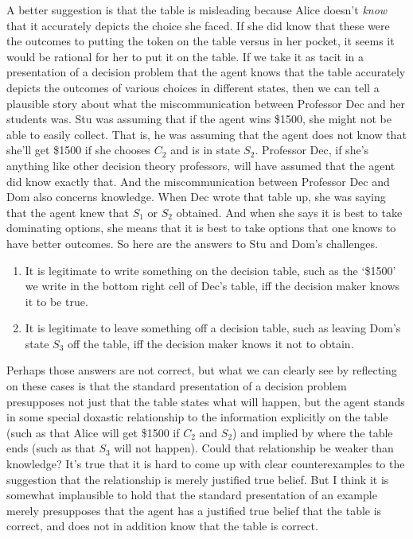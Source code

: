 A better suggestion is that the table is misleading because Alice doesn't \textit{know} that it accurately depicts the choice she faced. If she did know that these were the outcomes to putting the token on the table versus in her pocket, it seems it would be rational for her to put it on the table. If we take it as tacit in a presentation of a decision problem that the agent knows that the table accurately depicts the outcomes of various choices in different states, then we can tell a plausible story about what the miscommunication between Professor Dec and her students was. Stu was assuming that if the agent wins \$1500, she might not be able to easily collect. That is, he was assuming that the agent does not know that she'll get \$1500 if she chooses $C_2$ and is in state $S_2$. Professor Dec, if she's anything like other decision theory professors, will have assumed that the agent did know exactly that. And the miscommunication between Professor Dec and Dom also concerns knowledge. When Dec wrote that table up, she was saying that the agent knew that $S_1$ or $S_2$ obtained. And when she says it is best to take dominating options, she means that it is best to take options that one knows to have better outcomes. So here are the answers to Stu and Dom's challenges.

\begin{enumerate}
\item It is legitimate to write something on the decision table, such as the `\$1500' we write in the bottom right cell of Dec's table, iff the decision maker knows it to be true.
\item It is legitimate to leave something off a decision table, such as leaving Dom's state $S_3$ off the table, iff the decision maker knows it not to obtain.
\end{enumerate}

\noindent Perhaps those answers are not correct, but what we can clearly see by reflecting on these cases is that the standard presentation of a decision problem presupposes not just that the table states what will happen, but the agent stands in some special doxastic relationship to the information explicitly on the table (such as that Alice will get \$1500 if $C_2$ and $S_2$) and implied by where the table ends (such as that $S_3$ will not happen). Could that relationship be weaker than knowledge? It's true that it is hard to come up with clear counterexamples to the suggestion that the relationship is merely justified true belief. But I think it is somewhat implausible to hold that the standard presentation of an example merely presupposes that the agent has a justified true belief that the table is correct, and does not in addition know that the table is correct.

